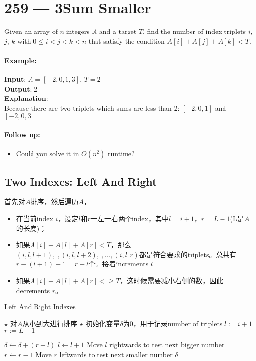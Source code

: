 \section{259 --- 3Sum Smaller}
Given an array of $n$ integers $A$ and a target $T$, find the number of index triplets $i$, $j$, $k$ with $0 \leq i < j < k < n$ that satisfy the condition $A[i] + A[j] + A[k] < T$.
\par
\paragraph{Example:}
\begin{flushleft}
\textbf{Input}: $A = [-2, 0, 1, 3]$, $T = 2$
\\
\textbf{Output}: 2
\\
\textbf{Explanation}:
\\
Because there are two triplets which sums are less than 2: $[-2, 0, 1]$ and $[-2, 0, 3]$
\end{flushleft}
\paragraph{Follow up:}
\begin{itemize}
\item Could you solve it in $O(n^2)$ runtime?
\end{itemize}
\subsection{Two Indexes: Left And Right}
首先对$A$排序，然后遍历$A$，
\begin{itemize}
\item 在当前index $i$，设定$l$和$r$一左一右两个index，其中$l=i+1$，$r=L-1$(L是$A$的长度)；
\item 如果$A[i]+A[l]+A[r]<T$，那么$(i, l, l+1),\ ,(i,l,l+2),\ ,\ldots, (i,l,r)$都是符合要求的triplets。总共有$r-(l+1)+1=r-l$个。接着increments  $l$
\item 如果$A[i]+A[l]+A[r]<\geq T$，这时候需要减小右侧的数，因此decrements $r$。
\end{itemize}
\setcounter{algorithm}{0}
\begin{algorithm}[H]
\caption{Left And Right Indexes}
\begin{algorithmic}[1]
\State $\star$ 对$A$从小到大进行排序
\State $\star$ 初始化变量$\delta$为0，用于记录number of triplets
\State $l:=i+1$
\State $r:=L-1$
\end{algorithmic}
\end{algorithm}
\begin{algorithm}[H]
\begin{algorithmic}[1]
\State $\delta\gets\delta + (r-l)$
\State $l\gets l+1$ \Comment Move $l$ rightwards to test next bigger number
\Else
\State $r\gets r-1$  \Comment Move $r$ leftwards to test next smaller number
\EndIf
\EndWhile
\EndFor
\State \Return $\delta$
\EndProcedure
\end{algorithmic}
\end{algorithm}